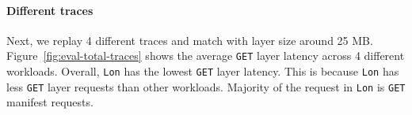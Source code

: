 \paragraph{Different traces}
Next,
we replay 4 different traces and match with layer size around 25 MB.
Figure~\ref{fig:eval-total-traces}
shows the average \texttt{GET} layer latency across 4 different workloads.
Overall,
\texttt{Lon} has the lowest
\texttt{GET} layer latency.
This is because \texttt{Lon} has less \texttt{GET} layer requests than other workloads.
Majority of the request in \texttt{Lon} is \texttt{GET} manifest requests.




